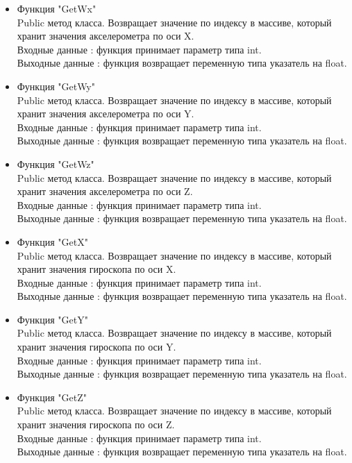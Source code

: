 \documentclass[a4document]{article}
\begin{document}
{\begin{itemize}
\begin{itemize}
                \item Функция "GetWx" \\
                    Public метод класса. Возвращает значение по индексу в массиве, который хранит значения акселерометра по оси X. \\ 
                    Входные данные : функция принимает параметр типа int. \\
                    Выходные данные : функция возвращает переменную типа указатель на float.
                \item Функция "GetWy" \\
                    Public метод класса. Возвращает значение по индексу в массиве, который хранит значения акселерометра по оси Y. \\ 
                    Входные данные : функция принимает параметр типа int. \\
                    Выходные данные : функция возвращает переменную типа указатель на float.
                \item Функция "GetWz" \\
                    Public метод класса. Возвращает значение по индексу в массиве, который хранит значения акселерометра по оси Z. \\ 
                    Входные данные : функция принимает параметр типа int. \\
                    Выходные данные : функция возвращает переменную типа указатель на float.
                \item Функция "GetX" \\
                    Public метод класса. Возвращает значение по индексу в массиве, который хранит значения гироскопа по оси X. \\ 
                    Входные данные : функция принимает параметр типа int. \\
                    Выходные данные : функция возвращает переменную типа указатель на float.
                \item Функция "GetY" \\
                    Public метод класса. Возвращает значение по индексу в массиве, который хранит значения гироскопа по оси Y. \\ 
                    Входные данные : функция принимает параметр типа int. \\
                    Выходные данные : функция возвращает переменную типа указатель на float.
                \newpage
                \item Функция "GetZ" \\
                    Public метод класса. Возвращает значение по индексу в массиве, который хранит значения гироскопа по оси Z. \\ 
                    Входные данные : функция принимает параметр типа int. \\
                    Выходные данные : функция возвращает переменную типа указатель на float.
                

\end{itemize}
\end{itemize}}
\end{document}
